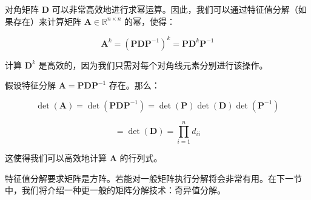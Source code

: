 对角矩阵 $ \boldsymbol{D} $ 可以非常高效地进行求幂运算。因此，我们可以通过特征值分解（如果存在）来计算矩阵 $ \boldsymbol{A} \in \mathbb{R}^{n \times n} $ 的幂，使得：

\begin{equation}
\boldsymbol{A}^k = (\boldsymbol{P} \boldsymbol{D} \boldsymbol{P}^{-1})^k = \boldsymbol{P} \boldsymbol{D}^k \boldsymbol{P}^{-1}
\tag{4.62}\label{eq:4-62}
\end{equation}

计算 $ \boldsymbol{D}^k $ 是高效的，因为我们只需对每个对角线元素分别进行该操作。

假设特征分解 $ \boldsymbol{A} = \boldsymbol{P} \boldsymbol{D} \boldsymbol{P}^{-1} $ 存在。那么：

\begin{equation}
\det(\boldsymbol{A}) = \det(\boldsymbol{P} \boldsymbol{D} \boldsymbol{P}^{-1}) = \det(\boldsymbol{P}) \det(\boldsymbol{D}) \det(\boldsymbol{P}^{-1})
\tag{4.63a}\label{eq:4-63a}
\end{equation}

\begin{equation}
= \det(\boldsymbol{D}) = \prod_{i=1}^n d_{ii}
\tag{4.63b}\label{eq:4-63b}
\end{equation}

这使得我们可以高效地计算 $ \boldsymbol{A} $ 的行列式。

特征值分解要求矩阵是方阵。若能对一般矩阵执行分解将会非常有用。在下一节中，我们将介绍一种更一般的矩阵分解技术：奇异值分解。
